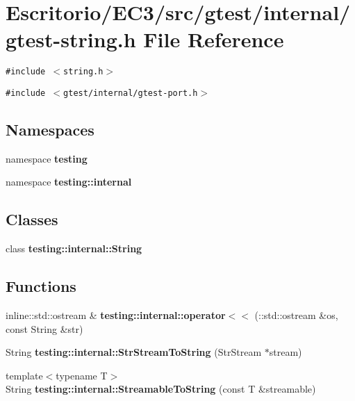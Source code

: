 \section{Escritorio/EC3/src/gtest/internal/gtest-string.h File Reference}
\label{gtest-string_8h}
{\tt \#include $<$string.h$>$}\par
{\tt \#include $<$gtest/internal/gtest-port.h$>$}\par
\subsection*{Namespaces}
\begin{CompactItemize}
\item 
namespace {\bf testing}
\item 
namespace {\bf testing::internal}
\end{CompactItemize}
\subsection*{Classes}
\begin{CompactItemize}
\item 
class {\bf testing::internal::String}
\end{CompactItemize}
\subsection*{Functions}
\begin{CompactItemize}
\item 
inline::std::ostream \& {\bf testing::internal::operator$<$$<$} (::std::ostream \&os, const String \&str)
\item 
String {\bf testing::internal::StrStreamToString} (StrStream $\ast$stream)
\item 
{\footnotesize template$<$typename T$>$ }\\String {\bf testing::internal::StreamableToString} (const T \&streamable)
\end{CompactItemize}
